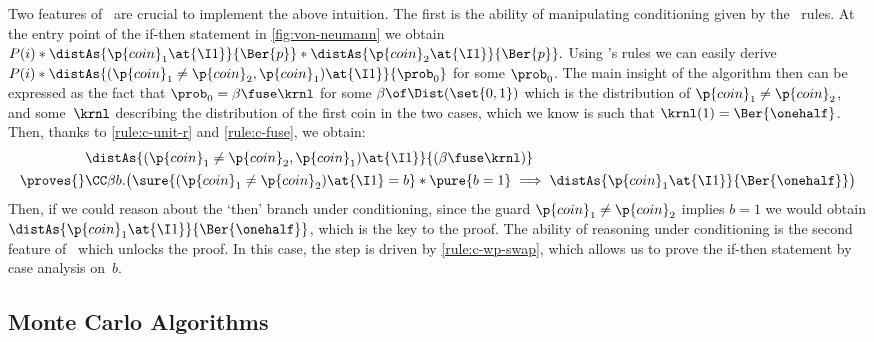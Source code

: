 Two features of \thelogic\ are crucial to implement the above intuition.
The first is the ability of manipulating conditioning given by the \supercond\ rules.
At the entry point of the if-then statement in \cref{fig:von-neumann}
we obtain
$
  P(i) *
  \distAs{\p{coin}_1\at{\I1}}{\Ber{p}} *
  \distAs{\p{coin}_2\at{\I1}}{\Ber{p}}.
$
Using \thelogic's rules we can easily derive
$
  P(i) *
  \distAs{(\p{coin}_1 \ne \p{coin}_2,\p{coin}_1)\at{\I1}}{\prob_0}
$
for some $\prob_0$.
The main insight of the algorithm then can be expressed as the fact that
$\prob_0 = \beta \fuse \krnl$ for some $\beta\of\Dist(\set{0,1})$
which is the distribution of $\p{coin}_1 \ne \p{coin}_2$,
and some~$\krnl$ describing the distribution of the first coin in the two
cases, which we know is such that $\krnl(1)=\Ber{\onehalf}$.
Then, thanks to \ref{rule:c-unit-r} and \ref{rule:c-fuse}, we obtain:
\begin{align*}
&\distAs{(\p{coin}_1 \ne \p{coin}_2,\p{coin}_1)\at{\I1}}{(\beta \fuse \krnl)}
\\ {}\proves{}&
\CC \beta b. \bigl(
  \sure{(\p{coin}_1 \ne \p{coin}_2)\at{\I1} = b} *
  \pure{b=1} \implies
    \distAs{\p{coin}_1\at{\I1}}{\Ber{\onehalf}}
\bigr)
\end{align*}
Then, if we could reason about the `then' branch under conditioning,
since the guard $\p{coin}_1 \ne \p{coin}_2$ implies $b=1$ we would obtain
$ \distAs{\p{coin}_1\at{\I1}}{\Ber{\onehalf}} $, which is the key to the proof.
The ability of reasoning under conditioning is the second feature
of \thelogic\ which unlocks the proof.
In this case, the step is driven by \cref{rule:c-wp-swap},
which allows us to prove the if-then statement by case analysis on~$b$.



\subsection{Monte Carlo Algorithms}
\label{sec:ex:monte-carlo}

